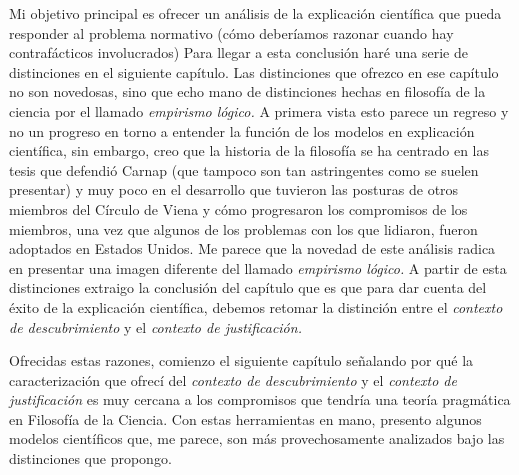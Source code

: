 {Mi objetivo principal es ofrecer un análisis de la
explicación científica que pueda responder al problema
normativo (cómo deberíamos razonar cuando hay contrafácticos
involucrados) Para llegar a esta conclusión haré una serie
de distinciones en el siguiente capítulo. Las distinciones
que ofrezco en ese capítulo no son novedosas, sino que
echo mano de distinciones hechas en filosofía de la
ciencia por el llamado \emph{empirismo lógico.} A primera
vista esto parece un regreso y no un progreso en torno a
entender la función de los modelos en explicación
científica, sin embargo, creo que la historia de la
filosofía se ha centrado en las tesis que defendió Carnap
(que tampoco son tan astringentes como se suelen presentar)
y muy poco en el desarrollo que tuvieron las posturas de
otros miembros del Círculo de Viena y cómo progresaron los
compromisos de los miembros, una vez que algunos de los
problemas con los que lidiaron, fueron adoptados en Estados
Unidos. Me parece que la novedad de este análisis radica en
presentar una imagen diferente del llamado \emph{empirismo
lógico.} A partir de esta distinciones extraigo la
conclusión del capítulo que es que para dar cuenta del éxito
de la explicación científica, debemos retomar la distinción
entre el \emph{contexto de descubrimiento} y el
\emph{contexto de justificación.}

Ofrecidas estas razones, comienzo el siguiente capítulo
señalando por qué la caracterización que ofrecí del
\emph{contexto de descubrimiento} y el \emph{contexto de
justificación} es muy cercana a los compromisos que tendría
una teoría pragmática en Filosofía de la Ciencia. Con estas
herramientas en mano, presento algunos modelos científicos
que, me parece, son más provechosamente analizados bajo las
distinciones que propongo.

}
